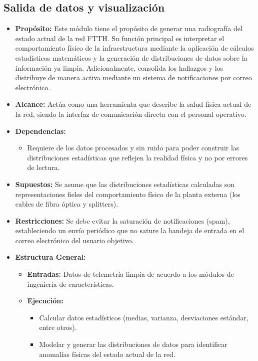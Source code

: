 \documentclass[12pt,a4paper]{article}
\begin{document}
    \subsection{Salida de datos y visualización}
    \begin{itemize}
        \item \textbf{Propósito:} Este módulo tiene el propósito de generar una radiografía del estado actual de la red FTTH. Su función principal es interpretar el comportamiento físico de la
        infraestructura mediante la aplicación de cálculos estadísticos matemáticos y la generación de distribuciones de datos sobre la información ya limpia. Adicionalmente, consolida los hallazgos
        y los distribuye de manera activa mediante un sistema de notificaciones por correo electrónico.

        \item \textbf{Alcance:} Actúa como una herramienta que describe la salud física actual de la red, siendo la interfaz de comunicación directa con el personal operativo.
        \item \textbf{Dependencias:}
        \begin{itemize}
            \item Requiere de los datos procesados y sin ruido para poder construir las distribuciones estadísticas que reflejen la realidad física y no por errores de lectura.
        \end{itemize}
        \item \textbf{Supuestos:} Se asume que las distribuciones estadísticas calculadas son representaciones fieles del comportamiento físico de la planta externa (los cables de fibra óptica y splitters).
        \item \textbf{Restricciones:} Se debe evitar la saturación de notificaciones (spam), estableciendo un envío periódico que no sature la bandeja de entrada en el correo electrónico del usuario objetivo.
        \item \textbf{Estructura General:} 
        \begin{itemize}
            \item \textbf{Entradas:} Datos de telemetría limpia de acuerdo a los módulos de ingeniería de características.
            \item \textbf{Ejecución:}
            \begin{itemize}
                \item Calcular datos estadísticos (medias, varianza, desviaciones estándar, entre otros).
                \item Modelar y generar las distribuciones de datos para identificar anomalías físicas del estado actual de la red.

\end{itemize}
\end{itemize}
\end{itemize}
\end{document}
